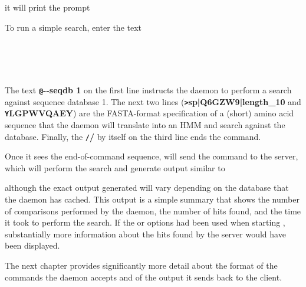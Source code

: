 \documentclass[notoc,justified]{tufte-book}    %
\begin{document}
it will print the prompt

 \vspace{-1ex}
 \vspace{-1ex}

To run a simple search, enter the text

\vspace{1ex}
 \\
 \\
 \\
\user{//}
\vspace{1ex}

The text {\small\bfseries\texttt @-{}-seqdb 1} on the first line instructs the daemon to perform a search against sequence database 1. The next two lines ({\small\bfseries\texttt >sp|Q6GZW9|length\_10} and {\small\bfseries\texttt YLGPWVQAEY}) are the FASTA-format specification of a (short) amino acid sequence that the daemon will translate into an HMM and search against the database.  Finally, the 
{\small\bfseries\texttt //} by itself on the third line ends the command.  

Once it sees the end-of-command sequence,  will send the command to the server, which will perform the search and generate output similar to

\vspace{-1ex}
 \vspace{-1ex}

 although the exact output generated will vary depending on the database that the daemon has cached.  This output is a simple summary that shows the number of comparisons performed by the daemon, the number of hits found, and the time it took to perform the search.  If the  or  options had been used when starting , substantially more information about the hits found by the server would have been displayed.

 The next chapter provides significantly more detail about the format of the commands the daemon accepts and of the output it sends back to the client.
\end{document}
